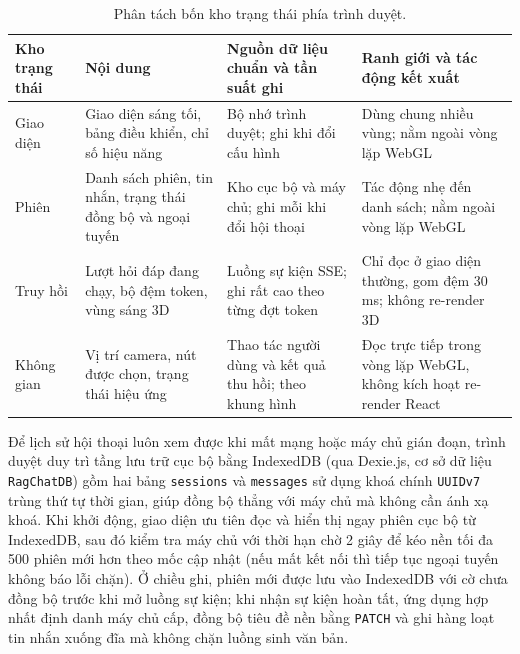 \begin{table}[htbp]
    \centering
    \caption{Phân tách bốn kho trạng thái phía trình duyệt.}
    \label{tab:bon-nhom-trang-thai}
    \footnotesize
    \begin{tabularx}{\textwidth}{@{}>{\raggedright\arraybackslash}p{2.0cm}>{\raggedright\arraybackslash}p{3.4cm}>{\raggedright\arraybackslash}p{3.8cm}>{\raggedright\arraybackslash}X@{}}
        \toprule
        \textbf{Kho trạng thái} & \textbf{Nội dung} & \textbf{Nguồn dữ liệu chuẩn và tần suất ghi} & \textbf{Ranh giới và tác động kết xuất} \\
        \midrule
        Giao diện & Giao diện sáng tối, bảng điều khiển, chỉ số hiệu năng & Bộ nhớ trình duyệt; ghi khi đổi cấu hình & Dùng chung nhiều vùng; nằm ngoài vòng lặp WebGL \\
        Phiên & Danh sách phiên, tin nhắn, trạng thái đồng bộ và ngoại tuyến & Kho cục bộ và máy chủ; ghi mỗi khi đổi hội thoại & Tác động nhẹ đến danh sách; nằm ngoài vòng lặp WebGL \\
        Truy hồi & Lượt hỏi đáp đang chạy, bộ đệm token, vùng sáng 3D & Luồng sự kiện SSE; ghi rất cao theo từng đợt token & Chỉ đọc ở giao diện thường, gom đệm 30 ms; không re-render 3D \\
        Không gian & Vị trí camera, nút được chọn, trạng thái hiệu ứng & Thao tác người dùng và kết quả thu hồi; theo khung hình & Đọc trực tiếp trong vòng lặp WebGL, không kích hoạt re-render React \\
        \bottomrule
    \end{tabularx}
\end{table}

Để lịch sử hội thoại luôn xem được khi mất mạng hoặc máy chủ gián đoạn, trình duyệt duy trì tầng lưu trữ cục bộ bằng IndexedDB (qua Dexie.js, cơ sở dữ liệu \texttt{RagChatDB}) gồm hai bảng \texttt{sessions} và \texttt{messages} sử dụng khoá chính \texttt{UUIDv7} trùng thứ tự thời gian, giúp đồng bộ thẳng với máy chủ mà không cần ánh xạ khoá. Khi khởi động, giao diện ưu tiên đọc và hiển thị ngay phiên cục bộ từ IndexedDB, sau đó kiểm tra máy chủ với thời hạn chờ 2 giây để kéo nền tối đa 500 phiên mới hơn theo mốc cập nhật (nếu mất kết nối thì tiếp tục ngoại tuyến không báo lỗi chặn). Ở chiều ghi, phiên mới được lưu vào IndexedDB với cờ chưa đồng bộ trước khi mở luồng sự kiện; khi nhận sự kiện hoàn tất, ứng dụng hợp nhất định danh máy chủ cấp, đồng bộ tiêu đề nền bằng \texttt{PATCH} và ghi hàng loạt tin nhắn xuống đĩa mà không chặn luồng sinh văn bản.

